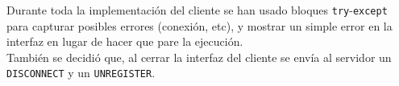 Durante toda la implementación del cliente se han usado bloques \texttt{try}-\texttt{except} para capturar posibles errores (conexión, etc), y mostrar un simple error en la interfaz en lugar de hacer que pare la ejecución.\\

También se decidió que, al cerrar la interfaz del cliente se envía al servidor un \texttt{DISCONNECT} y un \texttt{UNREGISTER}.